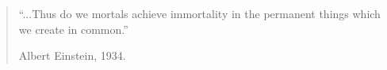 \documentclass[letterpaper,11pt]{report}
\begin{document}
\begin{quote}
    ``...Thus do we mortals achieve immortality in the permanent things which we create in common.''

    \hfill Albert Einstein, 1934.
\end{quote}
\newpage

\tableofcontents
{}
\setcounter{page}{1}











\appendix





\end{document}
